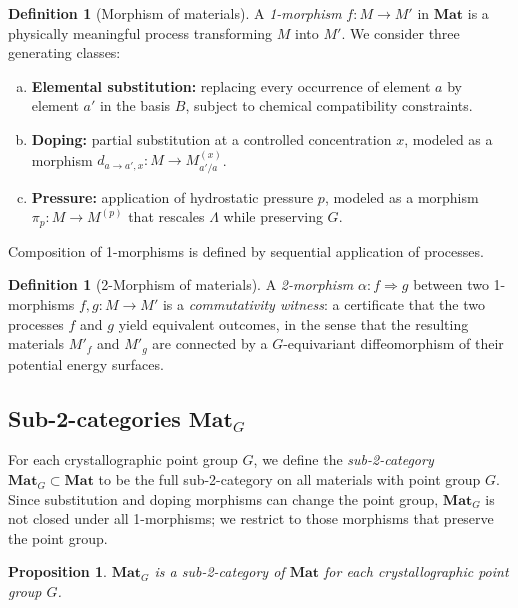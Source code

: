 \documentclass[12pt,a4paper]{article}
\theoremstyle{plain}
\newtheorem{proposition}[theorem]{Proposition}
\theoremstyle{definition}
\newtheorem{definition}[theorem]{Definition}
\theoremstyle{remark}
\newcommand{\Matl}{\mathbf{Mat}}
\newcommand{\MatlG}{\mathbf{Mat}_G}
\begin{document}
\begin{definition}[Morphism of materials]\label{def:morphism}
A \emph{1-morphism} $f \colon M \to M'$ in $\Matl$ is a physically
meaningful process transforming $M$ into $M'$.  We consider three generating
classes:
\begin{enumerate}[(a)]
  \item \textbf{Elemental substitution:} replacing every occurrence of
    element $a$ by element $a'$ in the basis $B$, subject to chemical
    compatibility constraints.
  \item \textbf{Doping:} partial substitution at a controlled concentration $x$,
    modeled as a morphism $d_{a \to a', x} \colon M \to M_{a'/a}^{(x)}$.
  \item \textbf{Pressure:} application of hydrostatic pressure $p$,
    modeled as a morphism $\pi_p \colon M \to M^{(p)}$ that rescales
    $\Lambda$ while preserving $G$.
\end{enumerate}
Composition of 1-morphisms is defined by sequential application of
processes.
\end{definition}

\begin{definition}[2-Morphism of materials]\label{def:2-morphism}
A \emph{2-morphism} $\alpha \colon f \Rightarrow g$ between two 1-morphisms
$f, g \colon M \to M'$ is a \emph{commutativity witness}: a certificate
that the two processes $f$ and $g$ yield equivalent outcomes, in the sense
that the resulting materials $M'_f$ and $M'_g$ are connected by a
$G$-equivariant diffeomorphism of their potential energy surfaces.
\end{definition}

\subsection{Sub-2-categories $\MatlG$}

For each crystallographic point group $G$, we define the \emph{sub-2-category}
$\MatlG \subset \Matl$ to be the full sub-2-category on all materials with
point group $G$.  Since substitution and doping morphisms can change the
point group, $\MatlG$ is not closed under all 1-morphisms; we restrict to
those morphisms that preserve the point group.

\begin{proposition}\label{prop:sub-2-cat}
$\MatlG$ is a sub-2-category of $\Matl$ for each crystallographic point
group $G$.
\end{proposition}
\end{document}
